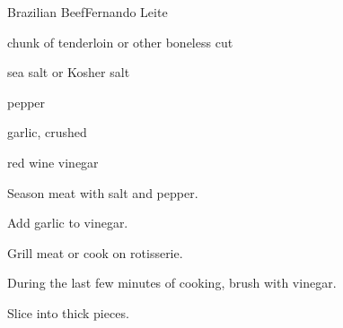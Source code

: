 \begin{recipe}{Brazilian Beef}{Fernando Leite}{}

\begin{ingredients}
\item chunk of  tenderloin or other boneless cut
\item sea salt or Kosher salt
\item pepper
\item garlic, crushed
\item red wine vinegar
\end{ingredients}

\begin{directions}
\item Season meat with salt and pepper.
\item Add garlic to vinegar.
\item Grill meat or cook on rotisserie.
\item During the last few minutes of cooking, brush with vinegar.
\item Slice into \inch{\half} thick pieces.
\end{directions}

\end{recipe}
